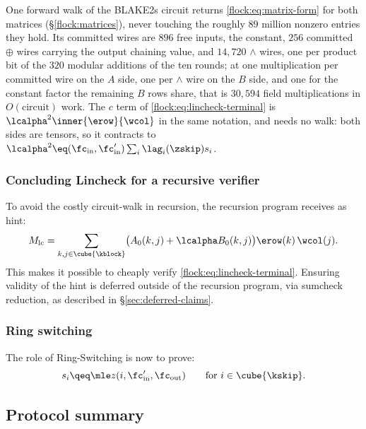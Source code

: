 One forward walk of the BLAKE2s circuit returns \eqref{flock:eq:matrix-form} for both matrices (\S\ref{flock:matrices}), never touching the roughly $89$ million nonzero entries they hold. Its committed wires are $896$ free inputs, the constant, $256$ committed $\oplus$ wires carrying the output chaining value, and $14{,}720$ $\wedge$ wires, one per product bit of the $320$ modular additions of the ten rounds; at one multiplication per committed wire on the $A$ side, one per $\wedge$ wire on the $B$ side, and one for the constant factor the remaining $B$ rows share, that is $30{,}594$ field multiplications in $O(\text{circuit})$ work. The $c$ term of \eqref{flock:eq:lincheck-terminal} is $\lcalpha^2\inner{\erow}{\wcol}$ in the same notation, and needs no walk: both sides are tensors, so it contracts to $\lcalpha^2\eq(\fc_{\mathrm{in}},\fc'_{\mathrm{in}})\sum_i\lag_i(\zskip)s_i$.

\subsubsection{Concluding Lincheck for a recursive verifier}\label{flock:defer}

To avoid the costly circuit-walk in recursion, the recursion program receives as hint:
\begin{equation}\label{flock:eq:matpart}
M_{\mathrm{lc}}=\sum_{k,j\in\cube{\kblock}}\bigl(A_0(k,j)+\lcalpha B_0(k,j)\bigr)\erow(k)\,\wcol(j).
\end{equation}
This makes it possible to cheaply verify \eqref{flock:eq:lincheck-terminal}. Ensuring validity of the hint is deferred outside of the recursion program, via sumcheck reduction, as described in \S\ref{sec:deferred-claims}.

\subsubsection{Ring switching}\label{flock:ringswitch}

The role of Ring-Switching is now to prove:
\[
s_i \qeq \mle z(i,\fc'_{\mathrm{in}},\fc_{\mathrm{out}})\qquad\text{for }i\in\cube{\kskip}.
\]


\subsection{Protocol summary}\label{flock:summary}

